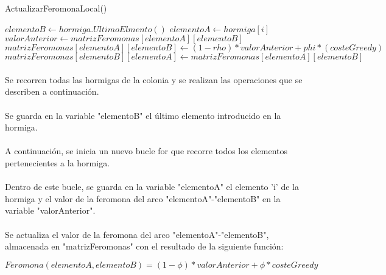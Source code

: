 	\begin{algorithm}[H]
		\caption{ActualizarFeromonaLocal()}
		\begin{algorithmic}
			\STATE$elementoB \leftarrow hormiga.UltimoElmento()$
			\STATE$elementoA\leftarrow hormiga[i]$
			\STATE$valorAnterior \leftarrow matrizFeromonas[elementoA][elementoB]$
			\STATE$matrizFeromonas[elementoA][elementoB]\leftarrow (1-rho)*valorAnterior+phi*(costeGreedy)$
			\STATE$matrizFeromonas[elementoB][elementoA]\leftarrow matrizFeromonas[elementoA][elementoB]$
			\ENDFOR
			\ENDFOR
		\end{algorithmic}
	\end{algorithm}

	\paragraph{}Se recorren todas las hormigas de la colonia y se realizan las operaciones que se describen a continuación.
	
	\paragraph{}Se guarda en la variable "elementoB" el último elemento introducido en la hormiga.
	
	\paragraph{}A continuación, se inicia un nuevo bucle for que recorre todos los elementos pertenecientes a la hormiga.
	
	\paragraph{}Dentro de este bucle, se guarda en la variable "elementoA" el elemento 'i' de la hormiga y el valor de la feromona del arco "elementoA"-"elementoB" en la variable "valorAnterior". 
	
	\paragraph{}Se actualiza el valor de la feromona del arco "elementoA"-"elementoB", almacenada en "matrizFeromonas" con el resultado de la siguiente función:
	
	\begin{center}
		$Feromona(elementoA,elementoB) = (1-\phi)*valorAnterior+\phi*costeGreedy$
	\end{center}

